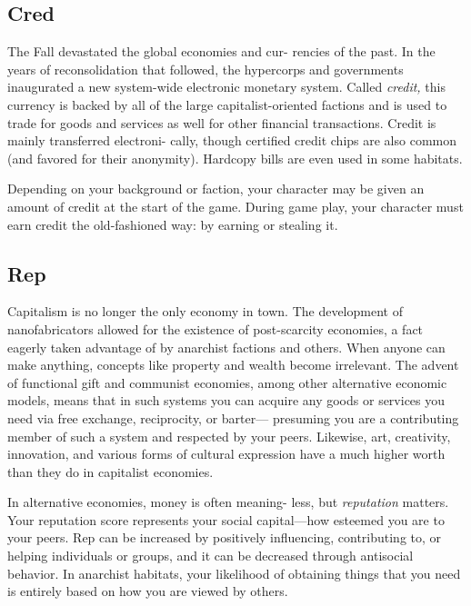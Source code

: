 \subsection{Cred}

The Fall devastated the global economies and cur-
rencies of the past. In the years of reconsolidation 
that followed, the hypercorps and governments 
inaugurated a new system-wide electronic monetary 
system. Called \textit{credit,} this currency is backed by all 
of the large capitalist-oriented factions and is used to 
trade for goods and services as well for other financial 
transactions. Credit is mainly transferred electroni-
cally, though certified credit chips are also common 
(and favored for their anonymity). Hardcopy bills are 
even used in some habitats.

Depending on your background or faction, your 
character may be given an amount of credit at the 
start of the game. During game play, your character 
must earn credit the old-fashioned way: by earning 
or stealing it.

\subsection{Rep}

Capitalism is no longer the only economy in town. 
The development of nanofabricators allowed for the 
existence of post-scarcity economies, a fact eagerly 
taken advantage of by anarchist factions and others. 
When anyone can make anything, concepts like 
property and wealth become irrelevant. The advent 
of functional gift and communist economies, among 
other alternative economic models, means that in 
such systems you can acquire any goods or services 
you need via free exchange, reciprocity, or barter—
presuming you are a contributing member of such 
a system and respected by your peers. Likewise, art, 
creativity, innovation, and various forms of cultural 
expression have a much higher worth than they do in 
capitalist economies.

In alternative economies, money is often meaning-
less, but \textit{reputation} matters. Your reputation score 
represents your social capital—how esteemed you 
are to your peers. Rep can be increased by positively 
influencing, contributing to, or helping individuals or 
groups, and it can be decreased through antisocial 
behavior. In anarchist habitats, your likelihood of 
obtaining things that you need is entirely based on 
how you are viewed by others.

